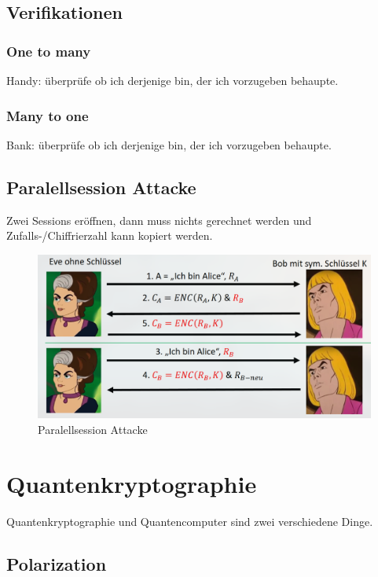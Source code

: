 \documentclass[12pt]{scrartcl}
\begin{document}
\subsection{Verifikationen}
\subsubsection{One to many}
Handy: überprüfe ob ich derjenige bin, der ich vorzugeben behaupte.


\subsubsection{Many to one}
Bank: überprüfe ob ich derjenige bin, der ich vorzugeben behaupte.


\newpage
\subsection{Paralellsession Attacke}
Zwei Sessions eröffnen, dann muss nichts gerechnet werden und Zufalls-/Chiffrierzahl
kann kopiert werden.

\begin{figure}[ht]
    \centering
    \includegraphics[width=\textwidth]{img/paralell_session_attack.png}
    \caption{Paralellsession Attacke}
    \label{fig:paralell_session_attack}
\end{figure}


\newpage
\section{Quantenkryptographie}

Quantenkryptographie und Quantencomputer sind zwei verschiedene Dinge.

\subsection{Polarization}
\end{document}
